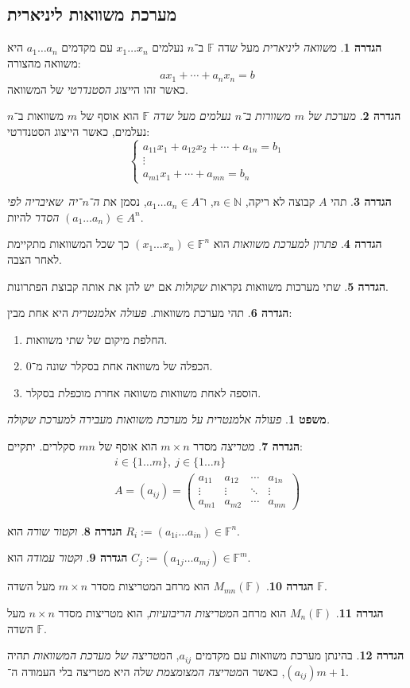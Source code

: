 \documentclass[]{article}
\newcommand\N     {\mathbb{N}}
\newcommand\n     {$n$־יה\ }
\newcommand\F         {\mathbb{F}}
\newcommand\pms[1]    {\begin{pmatrix}
		#1
\end{pmatrix}}
\newtheorem{Theorem}{משפט}
\theoremstyle{definition}
\newtheorem{definition}{הגדרה}
\newcommand\theo  [1] {\begin{Theorem}#1\end{Theorem}}
\newcommand\defi  [1] {\begin{definition}#1\end{definition}}
\begin{document}
\begin{multicols}{2}
		\section{מערכת משוואות ליניארית}
		\defi{\textit{משוואה ליניארית} מעל שדה $\F$ ב־$n$ נעלמים $x_1 \dots x_n$ עם מקדמים $a_1 \dots a_n$ היא משוואה מהצורה: 
		\[ ax_1 + \cdots + a_nx_n = b \]
		כאשר זהו ה\textit{ייצוג הסטנדרטי} של המשוואה. 
		}
		\defi{\textit{מערכת של $m$ משוורות ב־$n$ נעלמים מעל שדה $\F$} הוא אוסף של $m$ משוואות ב־$n$ נעלמים, כאשר הייצוג הסטנדרטי: 
		\[ \begin{cases}
			a_{11}x_1 + a_{12}x_2 + \cdots + a_{1n} = b_1 \\
			\vdots \\
			a_{m1}x_{1} + \cdots + a_{mn} = b_n
		\end{cases} \]}
		\defi{תהי $A$ קבוצה לא ריקה, $n \in \N$, ו־$a_1 \dots a_n \in A$, נסמן את \textit{ה־\n שאיבריה לפי הסדר} להיות $(a_1 \dots a_n) \in A^n$. }
		\defi{\textit{פתרון למערכת משוואות} הוא $(x_1 \dots x_n) \in \F^n$ כך שכל המשוואות מתקיימת לאחר הצבה. }
		\defi{שתי מערכות משוואות נקראות \textit{שקולות} אם יש להן את אותה קבוצת הפתרונות. }
		\defi{תהי מערכת משוואות. \textit{פעולה אלמנטרית} היא אחת מבין: 
		\begin{enumerate}
			\item החלפת מיקום של שתי משוואות. 
			\item הכפלה של משוואה אחת בסקלר שונה מ־0. 
			\item הוספה לאחת משוואות משוואה אחרת מוכפלת בסקלר. 
		\end{enumerate}
		}
		\theo{פעולה אלמנטרית על מערכת משוואות מעבירה למערכת שקולה. }
		\defi{\textit{מטריצה} מסדר $m \times n$ הוא אוסף של $mn$ סקלרים. יתקיים: 
		\begin{gather*}
			i \in \{1 \dots m\}, \ j \in \{1 \dots n\} \\ 
			A = (a_{ij}) = \pms{a_{11} & a_{12} & \cdots & a_{1n} \\ \vdots &\vdots & \ddots & \vdots \\ a_{m1} & a_{m2} & \cdots & a_{mn}}
		\end{gather*}}
		\defi{\textit{וקטור שורה} הוא $R_i := (a_{1i} \dots a_{in}) \in \F^{n}$. }
		\defi{\textit{וקטור עמודה} הוא $C_j := (a_{1j} \dots a_{mj}) \in \F^{m}$. }
		\defi{$M_{mn}(\F)$ הוא מרחב המטריצות מסדר $m \times n$ מעל השדה $\F$. }
		\defi{$M_n(\F)$ הוא מרחב ה\textit{מטריצות הריבועיות}, הוא מטריצות מסדר $n \times n$ מעל השדה $\F$. }
		\defi{בהינתן מערכת משוואות עם מקדמים $a_{ij}$, ה\textit{מטריצה של מערכת המשוואות} תהיה $(a_{ij})$, כאשר ה\textit{מטריצה המצומצמת} שלה היא מטריצה בלי העמודה ה־$m + 1$. 
}
\end{multicols}
\end{document}
